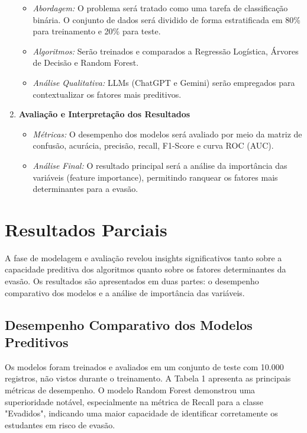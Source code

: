 \documentclass[brazilian, english, spanish]{RBIEarticle}
\begin{document}
\begin{enumerate}
    \begin{itemize}
        \item \textit{Abordagem:} O problema será tratado como uma tarefa de classificação binária. O conjunto de dados será dividido de forma estratificada em 80\% para treinamento e 20\% para teste.
        \item \textit{Algoritmos:} Serão treinados e comparados a Regressão Logística, Árvores de Decisão e Random Forest.
        \item \textit{Análise Qualitativa:} LLMs (ChatGPT e Gemini) serão empregados para contextualizar os fatores mais preditivos.
    \end{itemize}
    \item \textbf{Avaliação e Interpretação dos Resultados}
    \begin{itemize}
        \item \textit{Métricas:} O desempenho dos modelos será avaliado por meio da matriz de confusão, acurácia, precisão, recall, F1-Score e curva ROC (AUC).
        \item \textit{Análise Final:} O resultado principal será a análise da importância das variáveis (feature importance), permitindo ranquear os fatores mais determinantes para a evasão.
    \end{itemize}
\end{enumerate}

\section{Resultados Parciais}
A fase de modelagem e avaliação revelou insights significativos tanto sobre a capacidade preditiva dos algoritmos quanto sobre os fatores determinantes da evasão. Os resultados são apresentados em duas partes: o desempenho comparativo dos modelos e a análise de importância das variáveis.

\subsection{Desempenho Comparativo dos Modelos Preditivos}
Os modelos foram treinados e avaliados em um conjunto de teste com 10.000 registros, não vistos durante o treinamento. A Tabela 1 apresenta as principais métricas de desempenho. O modelo Random Forest demonstrou uma superioridade notável, especialmente na métrica de Recall para a classe "Evadidos", indicando uma maior capacidade de identificar corretamente os estudantes em risco de evasão.
\end{document}
